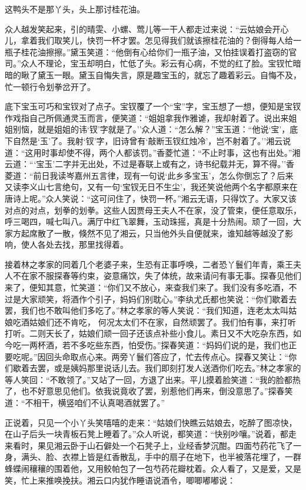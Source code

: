这鸭头不是那丫头，头上那讨桂花油。

众人越发笑起来，引的晴雯、小螺、莺儿等一干人都走过来说：``云姑娘会开心儿，拿着我们取笑儿，快罚一杯才罢。怎见得我们就该擦桂花油的？倒得每人给一瓶子桂花油擦擦。''黛玉笑道：``他倒有心给你们一瓶子油，又怕挂误着打盗窃的官司。''众人不理论，宝玉却明白，忙低了头。彩云有心病，不觉的红了脸。宝钗忙暗暗的瞅了黛玉一眼。黛玉自悔失言，原是趣宝玉的，就忘了趣着彩云。自悔不及，忙一顿行令划拳岔开了。

底下宝玉可巧和宝钗对了点子。宝钗覆了一个``宝''字，宝玉想了一想，便知是宝钗作戏指自己所佩通灵玉而言，便笑道：``姐姐拿我作雅谑，我却射着了。说出来姐姐别恼，就是姐姐的讳`钗'字就是了。''众人道：``怎么解？''宝玉道：``他说`宝'，底下自然是`玉'了。我射`钗'字，旧诗曾有`敲断玉钗红烛冷'，岂不射着了。''湘云说道：``这用时事却使不得，两个人都该罚。''香菱忙道：``不止时事，这也有出处。''湘云道：```宝玉'二字并无出处，不过是春联上或有之，诗书纪载并无，算不得。''香菱道：``前日我读岑嘉州五言律，现有一句说`此乡多宝玉'，怎么你倒忘了？后来又读李义山七言绝句，又有一句`宝钗无日不生尘'，我还笑说他两个名字都原来在唐诗上呢。''众人笑说：``这可问住了，快罚一杯。''湘云无语，只得饮了。大家又该对点的对点，划拳的划拳。这些人因贾母王夫人不在家，没了管束，便任意取乐，呼三喝四，喊七叫八。满厅中红飞翠舞，玉动珠摇，真是十分热闹。顽了一回，大家方起席散了一散，倏然不见了湘云，只当他外头自便就来，谁知越等越没了影响，使人各处去找，那里找得着。

接着林之孝家的同着几个老婆子来，生恐有正事呼唤，二者恐丫鬟们年青，乘王夫人不在家不服探春等约束，姿意痛饮，失了体统，故来请问有事无事。探春见他们来了，便知其意，忙笑道：``你们又不放心，来查我们来了。我们没有多吃酒，不过是大家顽笑，将酒作个引子，妈妈们别耽心。''李纨尤氏都也笑说：``你们歇着去罢，我们也不敢叫他们多吃了。''林之孝家的等人笑说：``我们知道，连老太太叫姑娘吃酒姑娘们还不肯吃，
何况太太们不在家，自然顽罢了。我们怕有事，来打听打听。二则天长了，姑娘们顽一回子还该点补些小食儿。素日又不大吃杂东西，如今吃一两杯酒，若不多吃些东西，怕受伤。''探春笑道：``妈妈们说的是，我们也正要吃呢。''因回头命取点心来。两旁丫鬟们答应了，忙去传点心。探春又笑让：``你们歇着去罢，或是姨妈那里说话儿去。我们即刻打发人送酒你们吃去。''林之孝家的等人笑回：``不敢领了。''又站了一回，方退了出来。平儿摸着脸笑道：``我的脸都热了，也不好意思见他们。依我说竟收了罢，别惹他们再来，倒没意思了。''探春笑道：``不相干，横竖咱们不认真喝酒就罢了。''

正说着，只见一个小丫头笑嘻嘻的走来：``姑娘们快瞧云姑娘去，吃醉了图凉快，在山子后头一块青板石凳上睡着了。''众人听说，都笑道：``快别吵嚷。''说着，都走来看时，果见湘云卧于山石僻处一个石凳子上，业经香梦沉酣。四面芍药花飞了一身，满头、脸、衣襟上皆是红香散乱，手中的扇子在地下，也半被落花埋了，一群蜂蝶闹穰穰的围着他，又用鲛帕包了一包芍药花瓣枕着。众人看了，又是爱，又是笑，忙上来推唤挽扶。湘云口内犹作睡语说酒令，唧唧嘟嘟说：

